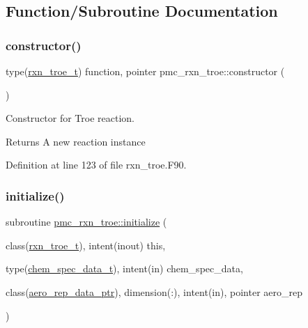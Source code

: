 \subsection{Function/\+Subroutine Documentation}
\mbox{\label{namespacepmc__rxn__troe_ae4ef42701effb43e507e4c34864821a1}} 
\subsubsection{\texorpdfstring{constructor()}{constructor()}}
{\footnotesize\ttfamily type(\mbox{\hyperlink{structpmc__rxn__troe_1_1rxn__troe__t}{rxn\+\_\+troe\+\_\+t}}) function, pointer pmc\+\_\+rxn\+\_\+troe\+::constructor (\begin{DoxyParamCaption}{ }\end{DoxyParamCaption})\hspace{0.3cm}{\ttfamily [private]}}



Constructor for Troe reaction. 

\begin{DoxyReturn}{Returns}
A new reaction instance 
\end{DoxyReturn}


Definition at line 123 of file rxn\+\_\+troe.\+F90.

\mbox{\label{namespacepmc__rxn__troe_a2a488c58d4247b8a4e876feb6686b150}} 
\subsubsection{\texorpdfstring{initialize()}{initialize()}}
{\footnotesize\ttfamily subroutine \mbox{\hyperlink{interfacepmc__aero__rep__data_1_1initialize}{pmc\+\_\+rxn\+\_\+troe\+::initialize}} (\begin{DoxyParamCaption}\item[{class(\mbox{\hyperlink{structpmc__rxn__troe_1_1rxn__troe__t}{rxn\+\_\+troe\+\_\+t}}), intent(inout)}]{this,  }\item[{type(\mbox{\hyperlink{structpmc__chem__spec__data_1_1chem__spec__data__t}{chem\+\_\+spec\+\_\+data\+\_\+t}}), intent(in)}]{chem\+\_\+spec\+\_\+data,  }\item[{class(\mbox{\hyperlink{structpmc__aero__rep__data_1_1aero__rep__data__ptr}{aero\+\_\+rep\+\_\+data\+\_\+ptr}}), dimension(\+:), intent(in), pointer}]{aero\+\_\+rep }\end{DoxyParamCaption})\hspace{0.3cm}{\ttfamily [private]}}



